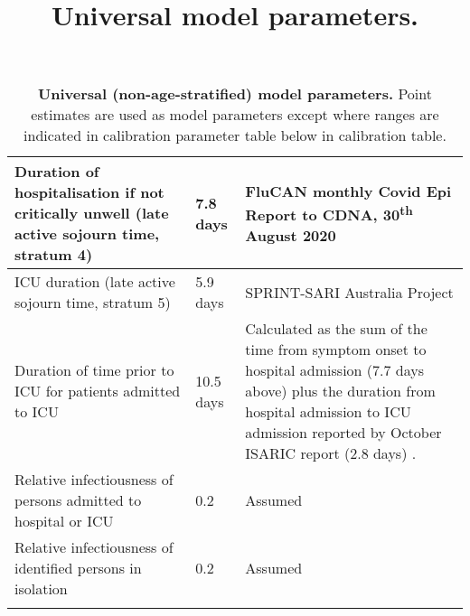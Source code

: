 \begin{longtable}[ht]{| >{\raggedright}p{4cm} | >{\raggedright}p{3cm} | p{6.8cm} |}
    \hline
    Duration of hospitalisation if not critically unwell (late active sojourn time, stratum 4) &
    7.8 days &
    FluCAN monthly Covid Epi Report to CDNA, 30\textsuperscript{th} August 2020 \\
    \hline
    ICU duration (late active sojourn time, stratum 5) & 5.9 days &
    SPRINT-SARI Australia Project \\
    \hline
    Duration of time prior to ICU for patients admitted to ICU & 
    10.5 days & 
    Calculated as the sum of the time from symptom onset to hospital admission (7.7 days above) plus the duration from hospital admission to ICU admission reported by October ISARIC report (2.8 days) \cite{RN22}. \\
    \hline
    Relative infectiousness of persons admitted to hospital or ICU & 0.2 & Assumed \\
    \hline
    Relative infectiousness of identified persons in isolation & 0.2 & Assumed \\
    \hline
	\caption{\textbf{Universal (non-age-stratified) model parameters.} Point estimates are used as model parameters except where ranges are indicated in calibration parameter table below in calibration table.}
	\title{Universal model parameters.}
	\label{tab:params}
\end{longtable}

